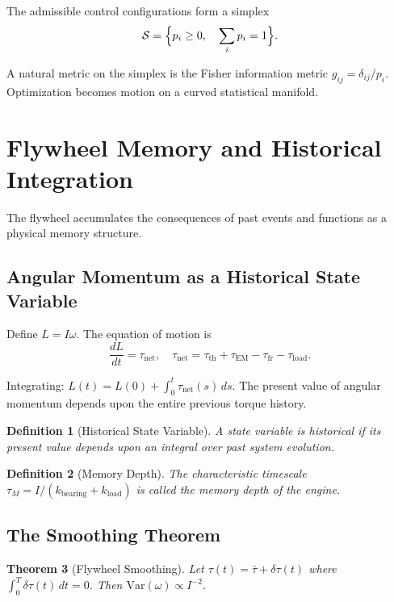 \documentclass[12pt,a4paper]{article}
\newtheorem{theorem}{Theorem}[section]
\newtheorem{definition}[theorem]{Definition}
\begin{document}
The admissible control configurations form a simplex
\[
\mathcal{S} = \Bigl\{ p_i \ge 0,\quad \sum_i p_i = 1 \Bigr\}.
\]

A natural metric on the simplex is the Fisher information metric $g_{ij} = \delta_{ij}/p_i$. Optimization becomes motion on a curved statistical manifold.

\section{Flywheel Memory and Historical Integration}

The flywheel accumulates the consequences of past events and functions as a physical memory structure.

\subsection{Angular Momentum as a Historical State Variable}

Define $L = I\omega$. The equation of motion is
\[
\frac{dL}{dt} = \tau_{\mathrm{net}}, \quad \tau_{\mathrm{net}} = \tau_{\mathrm{th}} + \tau_{\mathrm{EM}} - \tau_{\mathrm{fr}} - \tau_{\mathrm{load}}.
\]

Integrating: $L(t) = L(0) + \int_0^t \tau_{\mathrm{net}}(s)\, ds$. The present value of angular momentum depends upon the entire previous torque history.

\begin{definition}[Historical State Variable]
A state variable is \emph{historical} if its present value depends upon an integral over past system evolution.
\end{definition}

\begin{definition}[Memory Depth]
The characteristic timescale $\tau_M = I / (k_{\mathrm{bearing}} + k_{\mathrm{load}})$ is called the \emph{memory depth} of the engine.
\end{definition}

\subsection{The Smoothing Theorem}

\begin{theorem}[Flywheel Smoothing]
Let $\tau(t) = \bar\tau + \delta\tau(t)$ where $\int_0^T \delta\tau(t)\, dt = 0$. Then $\mathrm{Var}(\omega) \propto I^{-2}$.
\end{theorem}
\end{document}
